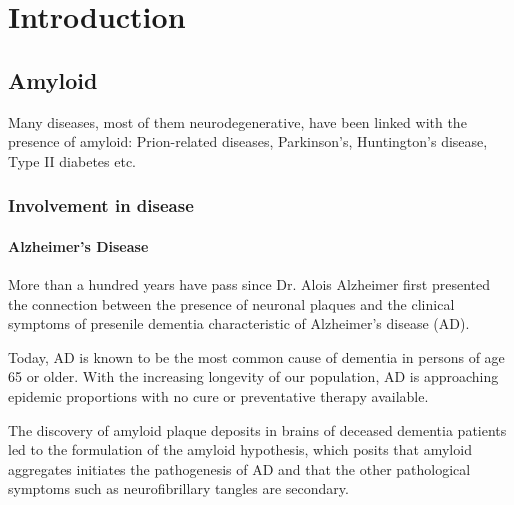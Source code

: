 \chapter{Introduction}


\section{Amyloid}
Many diseases, most of them neurodegenerative, have been linked with the presence of amyloid: Prion-related diseases, Parkinson's, Huntington's disease, Type II diabetes etc.

\subsection{Involvement in disease}

\subsubsection{Alzheimer's Disease}
\begin{outline}[enumerate]
	\1 More than a hundred years have pass since Dr. Alois Alzheimer first presented the connection between the presence of neuronal plaques and the clinical symptoms of presenile dementia characteristic of Alzheimer's disease (AD).

	\1 Today, AD is known to be the most common cause of dementia in persons of age 65 or older. With the increasing longevity of our population, AD is approaching epidemic proportions with no cure or preventative therapy available.\cite{Blennow:2006wd}

	\1 The discovery of amyloid plaque deposits in brains of deceased dementia patients led to the formulation of the amyloid hypothesis, which posits that amyloid aggregates initiates the pathogenesis of AD and that the other pathological symptoms such as neurofibrillary tangles are secondary.

\end{outline}

